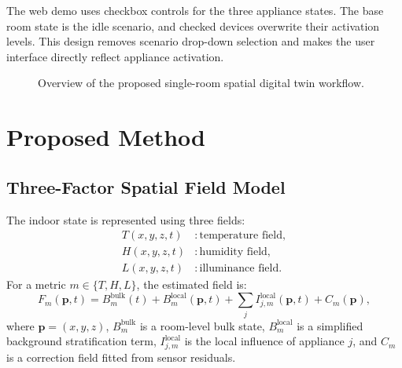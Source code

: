 \documentclass[conference]{IEEEtran}
\begin{document}
The web demo uses checkbox controls for the three appliance states. The base room state is the idle scenario, and checked devices overwrite their activation levels. This design removes scenario drop-down selection and makes the user interface directly reflect appliance activation.

\begin{figure}[t]
\centering
{}
\caption{Overview of the proposed single-room spatial digital twin workflow.}
\label{fig:architecture}
\end{figure}

\section{Proposed Method}
\subsection{Three-Factor Spatial Field Model}
The indoor state is represented using three fields:
\begin{align}
T(x,y,z,t) &: \text{temperature field},\\
H(x,y,z,t) &: \text{humidity field},\\
L(x,y,z,t) &: \text{illuminance field}.
\end{align}
For a metric $m \in \{T,H,L\}$, the estimated field is:
\begin{equation}
F_m(\mathbf{p},t) = B^{\mathrm{bulk}}_m(t) + B^{\mathrm{local}}_m(\mathbf{p},t) + \sum_j I^{\mathrm{local}}_{j,m}(\mathbf{p},t) + C_m(\mathbf{p}),
\end{equation}
where $\mathbf{p}=(x,y,z)$, $B^{\mathrm{bulk}}_m$ is a room-level bulk state, $B^{\mathrm{local}}_m$ is a simplified background stratification term, $I^{\mathrm{local}}_{j,m}$ is the local influence of appliance $j$, and $C_m$ is a correction field fitted from sensor residuals.
\end{document}
